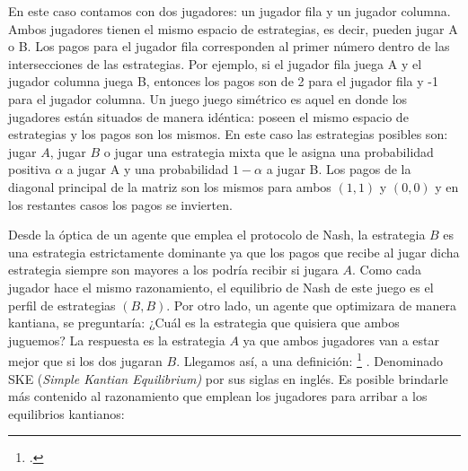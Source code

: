 En este caso contamos con dos jugadores: un jugador fila y un jugador columna. Ambos jugadores tienen el mismo espacio de estrategias, es decir, pueden jugar A o B. Los pagos para el jugador fila corresponden al primer número dentro de las intersecciones de las estrategias. Por ejemplo, si el jugador fila juega A y el jugador columna juega B, entonces los pagos son de 2 para el jugador fila y -1 para el jugador columna. Un juego juego simétrico es aquel en donde los jugadores están situados de manera idéntica: poseen el mismo espacio de estrategias y los pagos son los mismos. En este caso las estrategias posibles son: jugar $A$, jugar $B$ o jugar una estrategia mixta que le asigna una probabilidad positiva $\alpha$ a jugar A y una probabilidad $1-\alpha$ a jugar B. Los pagos de la diagonal principal de la matriz son los mismos para ambos $(1,1)$ y $(0,0)$ y en los restantes casos los pagos se invierten.

Desde la óptica de un agente que emplea el protocolo de Nash, la estrategia $B$ es una estrategia estrictamente dominante ya que los pagos que recibe al jugar dicha estrategia siempre son mayores a los podría recibir si jugara $A$. Como cada jugador hace el mismo razonamiento, el equilibrio de Nash de este juego es el perfil de estrategias $(B,B)$. Por otro lado, un agente que optimizara de manera kantiana, se preguntaría: ¿Cuál es la estrategia que quisiera que ambos juguemos? La respuesta es la estrategia $A$ ya que ambos jugadores van a estar mejor que si los dos jugaran $B$. Llegamos así, a una definición: \footnote{ \citep[p. 13]{Roemer_2019}.} \citep[p. 13]{Roemer_2019}. Denominado SKE (\textit{Simple Kantian Equilibrium)} por sus siglas en inglés. Es posible brindarle más contenido al razonamiento que emplean los jugadores para arribar a los equilibrios kantianos:

